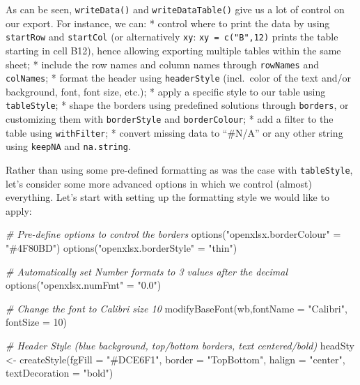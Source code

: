 \documentclass[
]{book}
\newenvironment{Shaded}{\begin{snugshade}}{\end{snugshade}}
\newcommand{\AttributeTok}[1]{\textcolor[rgb]{0.77,0.63,0.00}{#1}}
\newcommand{\CommentTok}[1]{\textcolor[rgb]{0.56,0.35,0.01}{\textit{#1}}}
\newcommand{\DecValTok}[1]{\textcolor[rgb]{0.00,0.00,0.81}{#1}}
\newcommand{\FunctionTok}[1]{\textcolor[rgb]{0.00,0.00,0.00}{#1}}
\newcommand{\NormalTok}[1]{#1}
\newcommand{\OtherTok}[1]{\textcolor[rgb]{0.56,0.35,0.01}{#1}}
\newcommand{\StringTok}[1]{\textcolor[rgb]{0.31,0.60,0.02}{#1}}
\begin{document}
As can be seen, \texttt{writeData()} and \texttt{writeDataTable()} give us a lot of control on our export. For instance, we can:
* control where to print the data by using \texttt{startRow} and \texttt{startCol} (or alternatively \texttt{xy}: \texttt{xy\ =\ c("B",12)} prints the table starting in cell B12), hence allowing exporting multiple tables within the same sheet;
* include the row names and column names through \texttt{rowNames} and \texttt{colNames};
* format the header using \texttt{headerStyle} (incl.~color of the text and/or background, font, font size, etc.);
* apply a specific style to our table using \texttt{tableStyle};
* shape the borders using predefined solutions through \texttt{borders}, or customizing them with \texttt{borderStyle} and \texttt{borderColour};
* add a filter to the table using \texttt{withFilter};
* convert missing data to ``\#N/A'' or any other string using \texttt{keepNA} and \texttt{na.string}.

Rather than using some pre-defined formatting as was the case with \texttt{tableStyle}, let's consider some more advanced options in which we control (almost) everything. Let's start with setting up the formatting style we would like to apply:

\begin{Shaded}
\begin{Highlighting}[]
\CommentTok{\# Pre{-}define options to control the borders }
\FunctionTok{options}\NormalTok{(}\StringTok{"openxlsx.borderColour"} \OtherTok{=} \StringTok{"\#4F80BD"}\NormalTok{)}
\FunctionTok{options}\NormalTok{(}\StringTok{"openxlsx.borderStyle"} \OtherTok{=} \StringTok{"thin"}\NormalTok{)}

\CommentTok{\# Automatically set Number formats to 3 values after the decimal}
\FunctionTok{options}\NormalTok{(}\StringTok{"openxlsx.numFmt"} \OtherTok{=} \StringTok{"0.0"}\NormalTok{)}

\CommentTok{\# Change the font to Calibri size 10}
\FunctionTok{modifyBaseFont}\NormalTok{(wb,}\AttributeTok{fontName =} \StringTok{"Calibri"}\NormalTok{, }\AttributeTok{fontSize =} \DecValTok{10}\NormalTok{)}

\CommentTok{\# Header Style (blue background, top/bottom borders, text centered/bold)}
\NormalTok{headSty }\OtherTok{\textless{}{-}} \FunctionTok{createStyle}\NormalTok{(}\AttributeTok{fgFill =} \StringTok{"\#DCE6F1"}\NormalTok{,}
                       \AttributeTok{border =} \StringTok{"TopBottom"}\NormalTok{,}
                       \AttributeTok{halign =} \StringTok{"center"}\NormalTok{,}
                       \AttributeTok{textDecoration =} \StringTok{"bold"}\NormalTok{)}
\end{Highlighting}
\end{Shaded}
\end{document}
